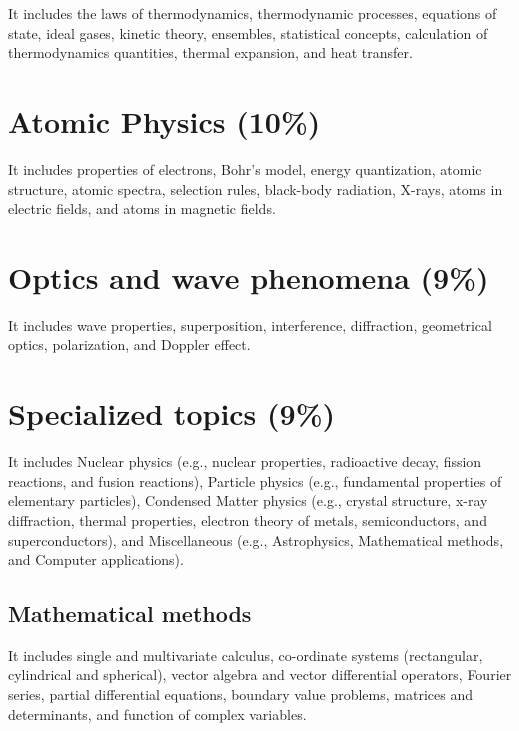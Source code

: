 \documentclass[12pt,a4paper]{article}
\begin{document}
It includes the laws of thermodynamics, thermodynamic processes, equations of state, ideal gases, kinetic theory, ensembles, statistical concepts, calculation of thermodynamics quantities, thermal expansion, and heat transfer.


\section{Atomic Physics (10\%)}

It includes properties of electrons, Bohr's model, energy quantization, atomic structure, atomic spectra, selection rules, black-body radiation, X-rays, atoms in electric fields, and atoms in magnetic fields.


\section{Optics and wave phenomena (9\%)}

It includes wave properties, superposition, interference, diffraction, geometrical optics, polarization, and Doppler effect.


\section{Specialized topics (9\%)}

It includes Nuclear physics (e.g., nuclear properties, radioactive decay, fission reactions, and fusion reactions), Particle physics (e.g., fundamental properties of elementary particles), Condensed Matter physics (e.g., crystal structure, x-ray diffraction, thermal properties, electron theory of metals, semiconductors, and superconductors), and Miscellaneous (e.g., Astrophysics, Mathematical methods, and Computer applications). 

\subsection{Mathematical methods}

It includes single and multivariate calculus, co-ordinate systems (rectangular, cylindrical and spherical), vector algebra and vector differential operators, Fourier series, partial differential equations, boundary value problems, matrices and determinants, and function of complex variables.
\end{document}
